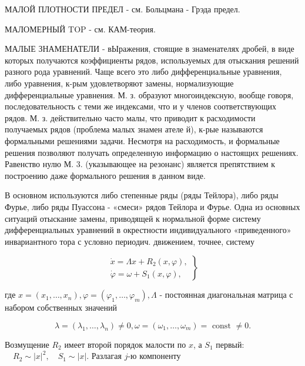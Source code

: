 \documentclass[10pt]{article}
\begin{document}
МАЛОЙ ПЛОТНОСТИ ПРЕДЕЛ - см. Больцмана - Грэда предел.



МАЛОМЕРНЫЙ TOP - см. КАМ-теория.



МАЛЫЕ ЗНАМЕНАТЕЛИ - вЫражения, стоящие в знаменателях дробей, в виде которых получаются коэффициенты рядов, используемых для отыскания решений разного рода уравнений. Чаще всего это либо дифференциальные уравнения, либо уравнения, к-рым удовлетворяют замены, нормализующие дифференциальные уравнения. М. з. образуют многоиндексную, вообще говоря, последовательность с теми же индексами, что и у членов соответствующих рядов. М. з. действительно часто малы, что приводит к расходимости получаемых рядов (проблема малых знамен ателе й), к-рые называются формальными решениями задачи. Несмотря на расходимость, и формальные решения позволяют получать определенную информацию о настоящих решениях. Равенство нулю М. 3. (указывающее на резонанс) является препятствием к построению даже формального решения в данном виде.



В основном используются либо степенные ряды (ряды Тейлора), либо ряды Фурье, либо ряды Пуассона - «смеси» рядов Тейлора и Фурье. Одна из основных ситуаций отыскание замены, приводящей к нормальной форме систему дифференциальных уравнений в окрестности индивидуального «приведенного» инвариантного тора с условно периодич. движением, точнее, систему



\[

\left.\begin{array}{l}

\dot{x}=\Lambda x+R_{2}(x, \varphi), \\

\dot{\varphi}=\omega+S_{1}(x, \varphi),

\end{array}\right\}

\]



где $x=\left(x_{1}, \ldots, x_{n}\right), \varphi=\left(\varphi_{1}, \ldots, \varphi_{m}\right), \Lambda$ - постоянная диагональная матрица с набором собственных значений



\[

\lambda=\left(\lambda_{1}, \ldots, \lambda_{n}\right) \neq 0, \omega=\left(\omega_{1}, \ldots, \omega_{m}\right)=\text { const } \neq 0 .

\]



Возмущение $R_{2}$ имеет второй порядок малости по $x$, а $S_{1}$ первый: $\quad R_{2} \sim|x|^{2}, \quad S_{1} \sim|x|$. Разлагая $j$-ю компоненту
\end{document}

